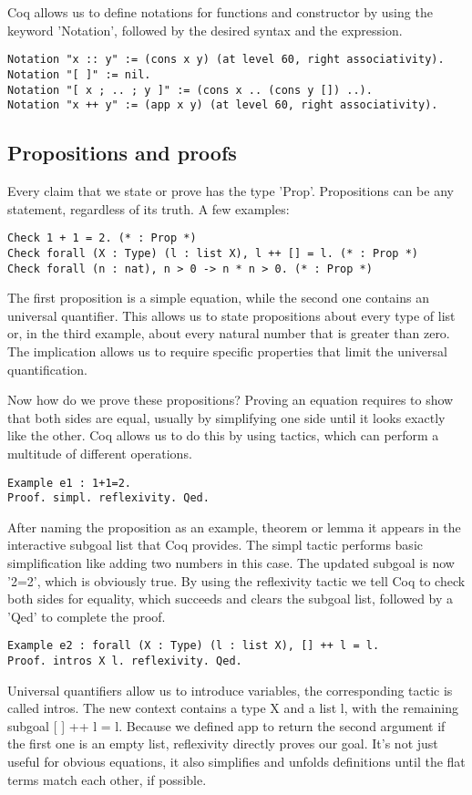 \documentclass{scrreprt}
\newcommand{\todo}[1]{\marginpar{\textbf{TODO:} #1}}
\begin{document}
Coq allows us to define notations for functions and constructor by using the keyword 'Notation', followed by the desired syntax and the expression. 
\begin{verbatim}
Notation "x :: y" := (cons x y) (at level 60, right associativity).
Notation "[ ]" := nil.
Notation "[ x ; .. ; y ]" := (cons x .. (cons y []) ..).
Notation "x ++ y" := (app x y) (at level 60, right associativity).
\end{verbatim}

\subsection{Propositions and proofs}
Every claim that we state or prove has the type 'Prop'. Propositions can be any statement, regardless of its truth. A few examples:
\begin{verbatim}
Check 1 + 1 = 2. (* : Prop *)
Check forall (X : Type) (l : list X), l ++ [] = l. (* : Prop *)
Check forall (n : nat), n > 0 -> n * n > 0. (* : Prop *)
\end{verbatim}
The first proposition is a simple equation, while the second one contains an universal quantifier. This allows us to state propositions about every type of list or, in the third example, about every natural number that is greater than zero. The implication allows us to require specific properties that limit the universal quantification.
\par
Now how do we prove these propositions? Proving an equation requires to show that both sides are equal, usually by simplifying one side until it looks exactly like the other. Coq allows us to do this by using tactics, which can perform a multitude of different operations.
\begin{verbatim}
Example e1 : 1+1=2.
Proof. simpl. reflexivity. Qed. 
\end{verbatim} 
\todo{Highlighting für Proof und Qed}
After naming the proposition as an example, theorem or lemma it appears in the interactive subgoal list that Coq provides. The simpl tactic performs basic simplification like adding two numbers in this case. The updated subgoal is now '2=2', which is obviously true. By using the reflexivity tactic we tell Coq to check both sides for equality, which succeeds and clears the subgoal list, followed by a 'Qed' to complete the proof.
\begin{verbatim}
Example e2 : forall (X : Type) (l : list X), [] ++ l = l.
Proof. intros X l. reflexivity. Qed.
\end{verbatim}
Universal quantifiers allow us to introduce variables, the corresponding tactic is called intros. The new context contains a type X and a list l, with the remaining subgoal [ ] ++ l = l. Because we defined app to return the second argument if the first one is an empty list, reflexivity directly proves our goal. It's not just useful for obvious equations, it also simplifies and unfolds definitions until the flat terms match each other, if possible.
 

\appendix



\end{document}
